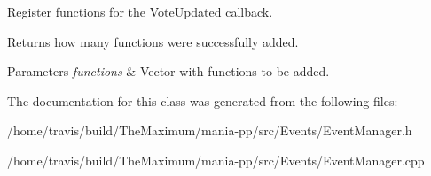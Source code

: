 Register functions for the Vote\-Updated callback. 

Returns how many functions were successfully added.


\begin{DoxyParams}{Parameters}
{\em functions} & Vector with functions to be added. \\
\hline
\end{DoxyParams}


The documentation for this class was generated from the following files\-:\begin{DoxyCompactItemize}
\item 
/home/travis/build/\-The\-Maximum/mania-\/pp/src/\-Events/Event\-Manager.\-h\item 
/home/travis/build/\-The\-Maximum/mania-\/pp/src/\-Events/Event\-Manager.\-cpp\end{DoxyCompactItemize}
